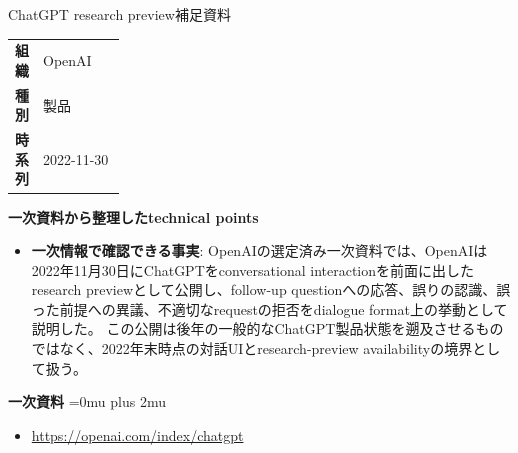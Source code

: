 \begin{technicalnote}{ChatGPT research preview}{補足資料}
\begingroup
\begin{tabularx}{\linewidth}{@{}>{\bfseries}p{0.22\linewidth}X@{}}
組織 & OpenAI \\
種別 & 製品 \\
時系列 & 2022-11-30 \\
\end{tabularx}
\smallskip
{\bfseries 一次資料から整理したtechnical points}
\begin{itemize}[leftmargin=1.5em,itemsep=0.35em]
\item \textbf{一次情報で確認できる事実}: OpenAIの選定済み一次資料では、OpenAIは2022年11月30日にChatGPTをconversational interactionを前面に出したresearch previewとして公開し、follow-up questionへの応答、誤りの認識、誤った前提への異議、不適切なrequestの拒否をdialogue format上の挙動として説明した。 この公開は後年の一般的なChatGPT製品状態を遡及させるものではなく、2022年末時点の対話UIとresearch-preview availabilityの境界として扱う。
\end{itemize}
\begin{minipage}{\linewidth}
\begin{samepage}
{\bfseries 一次資料}
\begingroup\sloppy
\Urlmuskip=0mu plus 2mu\relax
\begin{itemize}[leftmargin=1.5em,itemsep=0.25em]
\item {\scriptsize\url{https://openai.com/index/chatgpt}}
\end{itemize}
\endgroup
\end{samepage}
\end{minipage}
\endgroup
\end{technicalnote}
\medskip

